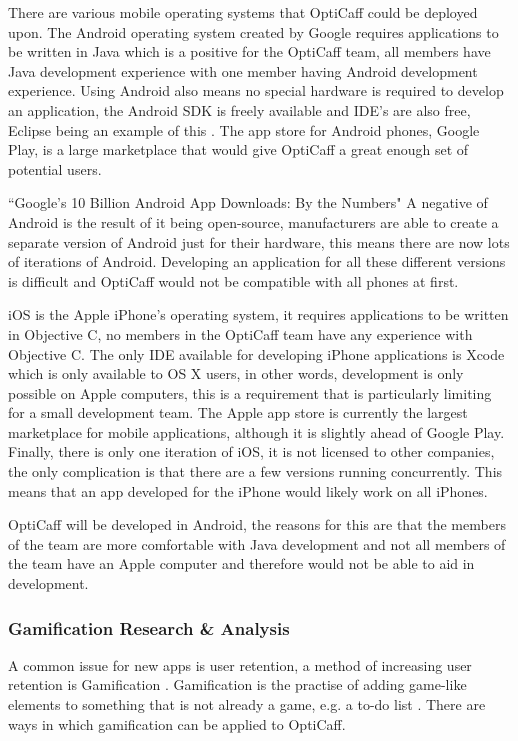 There are various mobile operating systems that OptiCaff could be deployed upon. The Android operating system created by Google requires applications to be written in Java which is a positive for the OptiCaff team, all members have Java development experience with one member having Android development experience. Using Android also means no special hardware is required to develop an application, the Android SDK is freely available and IDE’s are also free, Eclipse being an example of this \cite{Eclipse}. The app store for Android phones, Google Play, is a large marketplace that would give OptiCaff a great enough set of potential users.

``Google’s 10 Billion Android App Downloads: By the Numbers" \newline
A negative of Android is the result of it being open-source, manufacturers are able to create a separate version of Android just for their hardware, this means there are now lots of iterations of Android. Developing an application for all these different versions is difficult and OptiCaff would not be compatible with all phones at first.

iOS is the Apple iPhone’s operating system, it requires applications to be written in Objective C, no members in the OptiCaff team have any experience with Objective C. The only IDE available for developing iPhone applications is Xcode which is only available to OS X users, in other words, development is only possible on Apple computers, this is a requirement that is particularly limiting for a small development team. The Apple app store is currently the largest marketplace for mobile applications, although it is slightly ahead of Google Play. Finally, there is only one iteration of iOS, it is not licensed to other companies, the only complication is that there are a few versions running concurrently. This means that an app developed for the iPhone would likely work on all iPhones.

OptiCaff will be developed in Android, the reasons for this are that the members of the team are more comfortable with Java development and not all members of the team have an Apple computer and therefore would not be able to aid in development.

\subsubsection{Gamification Research \& Analysis}
A common issue for new apps is user retention, a method of increasing user retention is Gamification \cite{gamification1}. Gamification is the practise of adding game-like elements to something that is not already a game, e.g. a to-do list \cite{gamification2}. There are ways in which gamification can be applied to OptiCaff.

